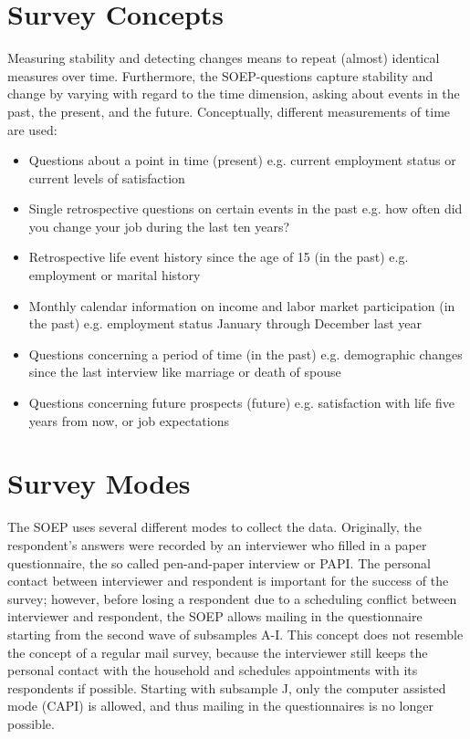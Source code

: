 \documentclass[letterpaper,10pt,openany,onesideH,english]{sphinxmanual}
\begin{document}
\section{Survey Concepts}
\label{\detokenize{Survey Design/index:survey-concepts}}
Measuring stability and detecting changes means to repeat (almost) identical measures over time. Furthermore, the SOEP-questions capture stability and change by varying with regard to the time dimension, asking about events in the past, the present, and the future. Conceptually, different measurements of time are used:
\begin{itemize}
\item {} 
Questions about a point in time (present) e.g. current employment status or current levels of satisfaction

\item {} 
Single retrospective questions on certain events in the past e.g. how often did you change your job during the last ten years?

\item {} 
Retrospective life event history since the age of 15 (in the past) e.g. employment or marital history

\item {} 
Monthly calendar information on income and labor market participation (in the past) e.g. employment status January through December last year

\item {} 
Questions concerning a period of time (in the past) e.g. demographic changes since the last interview like marriage or death of spouse

\item {} 
Questions concerning future prospects (future) e.g. satisfaction with life five years from now, or job expectations

\end{itemize}


\section{Survey Modes}
\label{\detokenize{Survey Design/index:survey-modes}}
The SOEP uses several different modes to collect the data. Originally, the respondent’s answers were recorded by an interviewer who filled in a paper questionnaire, the so called pen-and-paper interview or PAPI. The personal contact between interviewer and respondent is important for the success of the survey; however, before losing a respondent due to a scheduling conflict between interviewer and respondent, the SOEP allows mailing in the questionnaire starting from the second wave of subsamples A-I. This concept does not resemble the concept of a regular mail survey, because the interviewer still keeps the personal contact with the household and schedules appointments with its respondents if possible. Starting with subsample J, only the computer assisted mode (CAPI) is allowed, and thus mailing in the questionnaires is no longer possible.
\end{document}
